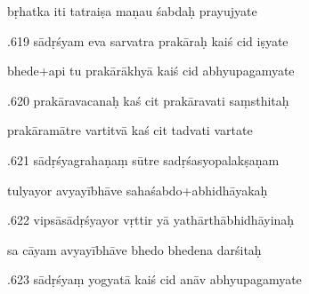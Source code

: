 \documentclass[article,12pt,a4paper]{memoir}%
\newcounter{parCount}
\begin{document}
	  
	  \pstart \leavevmode%
	bṛhatka iti tatraiṣa maṇau śabdaḥ prayujyate 
	{}
	\pend%
      

	  
	  \pstart {}.619 sādṛśyam eva sarvatra prakāraḥ kaiś cid iṣyate 
	{}
	\pend%
      

	  
	  \pstart \leavevmode%
	bhede+api tu prakārākhyā kaiś cid abhyupagamyate 
	{}
	\pend%
      

	  
	  \pstart {}.620 prakāravacanaḥ kaś cit prakāravati saṃsthitaḥ 
	{}
	\pend%
      

	  
	  \pstart \leavevmode%
	prakāramātre vartitvā kaś cit tadvati vartate 
	{}
	\pend%
      

	  
	  \pstart {}.621 sādṛśyagrahaṇaṃ sūtre sadṛśasyopalakṣaṇam 
	{}
	\pend%
      

	  
	  \pstart \leavevmode%
	tulyayor avyayībhāve sahaśabdo+abhidhāyakaḥ 
	{}
	\pend%
      

	  
	  \pstart {}.622 vipsāsādṛśyayor vṛttir yā yathārthābhidhāyinaḥ 
	{}
	\pend%
      

	  
	  \pstart \leavevmode%
	sa cāyam avyayībhāve bhedo bhedena darśitaḥ 
	{}
	\pend%
      

	  
	  \pstart {}.623 sādṛśyaṃ yogyatā kaiś cid anāv abhyupagamyate 
	{}
	\pend%
      
\end{document}
